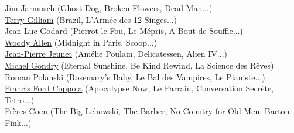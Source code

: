 \href{https://www.rottentomatoes.com/celebrity/jim_jarmusch/}{Jim Jarmusch} 
(Ghost Dog, Broken Flowers, Dead Man...) \\
\href{https://www.rottentomatoes.com/celebrity/terry_gilliam/}{Terry Gilliam}
 (Brazil, L'Armée des 12 Singes...) \\
\href{https://www.rottentomatoes.com/celebrity/jeanluc_godard/}{Jean-Luc Godard} 
(Pierrot le Fou, Le Mépris, A Bout de Souffle...) \\
\href{https://www.rottentomatoes.com/celebrity/woody_allen/}{Woody Allen} 
(Midnight in Paris, Scoop...) \\
\href{https://www.rottentomatoes.com/celebrity/jeanpierre_jeunet/}{Jean-Pierre Jeunet}
 (Amélie Poulain, Delicatessen, Alien IV...) \\
\href{https://www.rottentomatoes.com/celebrity/michel_gondry/}{Michel Gondry} 
(Eternal Sunshine, Be Kind Rewind, La Science des Rêves) \\
\href{https://www.rottentomatoes.com/celebrity/roman_polanski/}{Roman Polanski} 
(Rosemary's Baby, Le Bal des Vampires, Le Pianiste...) \\
\href{https://www.rottentomatoes.com/celebrity/francis_ford_coppola/}{Francis Ford Coppola}
 (Apocalypse Now, Le Parrain, Conversation Secrète, Tetro...) \\
\href{https://www.rottentomatoes.com/celebrity/joel_coen/}{Frères Coen}
 (The Big Lebowski, The Barber, No Country for Old Men, Barton Fink...) \\

